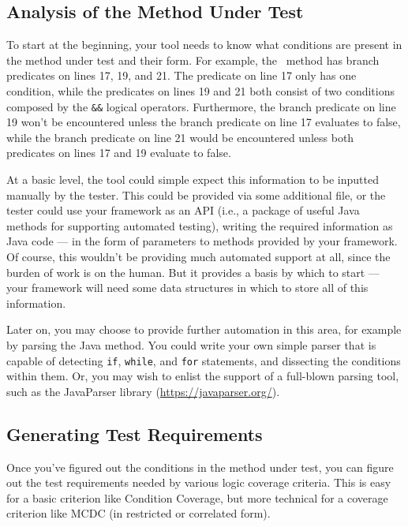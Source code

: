 \subsection{Analysis of the Method Under Test}

To start at the beginning, your tool needs to know what conditions are present
in the method under test and their form. For example, the
\calculatemethod~method has branch predicates on lines 17, 19, and 21. The
predicate on line 17 only has one condition, while the predicates on lines 19
and 21 both consist of two conditions composed by the {\tt \&\&} logical
operators. Furthermore, the branch predicate on line 19 won't be encountered
unless the branch predicate on line 17 evaluates to false, while the branch
predicate on line 21 would be encountered unless both predicates on lines 17 and
19 evaluate to false.

At a basic level, the tool could simple expect this information to be inputted
manually by the tester. This could be provided via some additional file, or the
tester could use your framework as an API (i.e., a package of useful Java
methods for supporting automated testing), writing the required information as
Java code --- in the form of parameters to methods provided by your framework. 
%
Of course, this wouldn't be providing much automated support at all, since the
burden of work is on the human. But it provides a basis by which to start ---
your framework will need some data structures in which to store all of this
information. 

Later on, you may choose to provide further automation in this area, for example
by parsing the Java method. You could write your own simple parser that is
capable of detecting {\tt if}, {\tt while}, and {\tt for} statements, and
dissecting the conditions within them.
%
Or, you may wish to enlist the support of a full-blown parsing tool, such as the
JavaParser library (\url{https://javaparser.org/}).

\subsection{Generating Test Requirements}

Once you've figured out the conditions in the method under test, you can figure
out the test requirements needed by various logic coverage criteria. This is
easy for a basic criterion like Condition Coverage, but more technical for a
coverage criterion like MCDC (in restricted or correlated form). 

